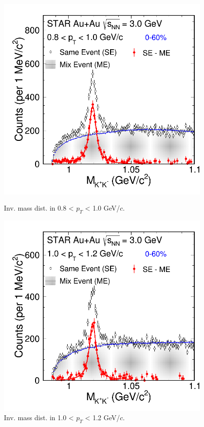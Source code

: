 \begin{figure}[htbp]
\begin{minipage}[htbp]{0.45\linewidth}
\centering
\includegraphics[width=0.95\textwidth]{chapterY/fig/fig1_signal_0_4.png}
\caption{Inv. mass dist. in 0.8 < $p_T$ < 1.0 GeV/$c$. \label{fig:mixedEvent_pT4}}
\end{minipage}
\hfill
\begin{minipage}[htbp]{0.45\linewidth}
\centering
\includegraphics[width=0.95\textwidth]{chapterY/fig/fig1_signal_0_5.png} 
\caption{Inv. mass dist. in 1.0 < $p_T$ < 1.2 GeV/$c$. \label{fig:mixedEvent_pT5}}
\end{minipage}
\end{figure}

